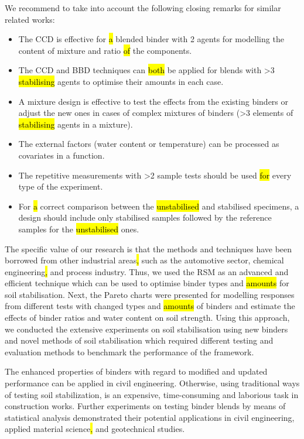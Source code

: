 \documentclass[eprint,
]{actapoly}
\begin{document}
We recommend to take into account the following closing remarks for similar related works:
\begin{itemize}
	\item The CCD is effective for \hl{a} blended binder with 2 agents for modelling the content of mixture and ratio \hl{of} the components.
	\item The CCD and BBD techniques\hl{ }can \hl{both} be applied for blends with >3 \hl{stabilising} agents to optimise their amounts in each case.
	\item A mixture design is effective to test the effects from the existing binders or adjust the new ones in cases of complex mixtures of binders (>3 elements of \hl{stabilising} agents in a mixture).
	\item The external factors (water content or temperature) can be processed as covariates in a function.
	\item The repetitive measurements with >2 sample tests should be used \hl{for} every type of the experiment.
	\item For \hl{a} correct comparison between the \hl{unstabilised} and stabilised specimens, a design should include only stabilised samples followed by the reference samples for the \hl{unstabilised} ones.
\end{itemize}

The specific value of our research is that the methods and techniques have been borrowed from other industrial areas\hl{, }such as the automotive sector, chemical engineering\hl{, }and process industry. Thus, we used the RSM as an advanced and efficient technique which can be used to optimise binder types and \hl{amounts} for soil stabilisation. Next, the Pareto charts were presented for modelling responses from different tests with changed types and \hl{amounts} of binders and estimate the effects of binder ratios and water content on soil strength. Using this approach, we conducted the extensive experiments on soil stabilisation using new binders and novel methods of soil stabilisation which required different testing and evaluation methods to benchmark the performance of the framework. 

The enhanced properties of binders with regard to modified and updated performance can be applied in civil engineering. Otherwise, using traditional ways of testing\hl{ }soil stabilization, is an expensive, time-consuming and laborious task in construction works. Further experiments on testing binder blends by means of statistical analysis demonstrated their potential applications in civil engineering, applied material science\hl{, }and geotechnical studies. 
\end{document}
